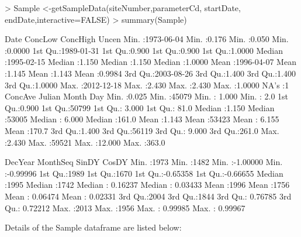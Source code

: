 \documentclass[a4paper,11pt]{article}
\begin{document}
\begin{Schunk}
\begin{Sinput}
> Sample <-getSampleData(siteNumber,parameterCd,
       startDate, endDate,interactive=FALSE)
> summary(Sample)
\end{Sinput}
\begin{Soutput}
      Date               ConcLow         ConcHigh         Uncen       
 Min.   :1973-06-04   Min.   :0.176   Min.   :0.050   Min.   :0.0000  
 1st Qu.:1989-01-31   1st Qu.:0.900   1st Qu.:0.900   1st Qu.:1.0000  
 Median :1995-02-15   Median :1.150   Median :1.150   Median :1.0000  
 Mean   :1996-04-07   Mean   :1.145   Mean   :1.143   Mean   :0.9984  
 3rd Qu.:2003-08-26   3rd Qu.:1.400   3rd Qu.:1.400   3rd Qu.:1.0000  
 Max.   :2012-12-18   Max.   :2.430   Max.   :2.430   Max.   :1.0000  
                      NA's   :1                                       
    ConcAve          Julian          Month             Day       
 Min.   :0.025   Min.   :45079   Min.   : 1.000   Min.   :  2.0  
 1st Qu.:0.900   1st Qu.:50799   1st Qu.: 3.000   1st Qu.: 81.0  
 Median :1.150   Median :53005   Median : 6.000   Median :161.0  
 Mean   :1.143   Mean   :53423   Mean   : 6.155   Mean   :170.7  
 3rd Qu.:1.400   3rd Qu.:56119   3rd Qu.: 9.000   3rd Qu.:261.0  
 Max.   :2.430   Max.   :59521   Max.   :12.000   Max.   :363.0  
                                                                 
    DecYear        MonthSeq        SinDY              CosDY         
 Min.   :1973   Min.   :1482   Min.   :-1.00000   Min.   :-0.99996  
 1st Qu.:1989   1st Qu.:1670   1st Qu.:-0.65358   1st Qu.:-0.66655  
 Median :1995   Median :1742   Median : 0.16237   Median : 0.03433  
 Mean   :1996   Mean   :1756   Mean   : 0.06474   Mean   : 0.02331  
 3rd Qu.:2004   3rd Qu.:1844   3rd Qu.: 0.76785   3rd Qu.: 0.72212  
 Max.   :2013   Max.   :1956   Max.   : 0.99985   Max.   : 0.99967  
\end{Soutput}
\end{Schunk}

Details of the Sample dataframe are listed below:
\end{document}
